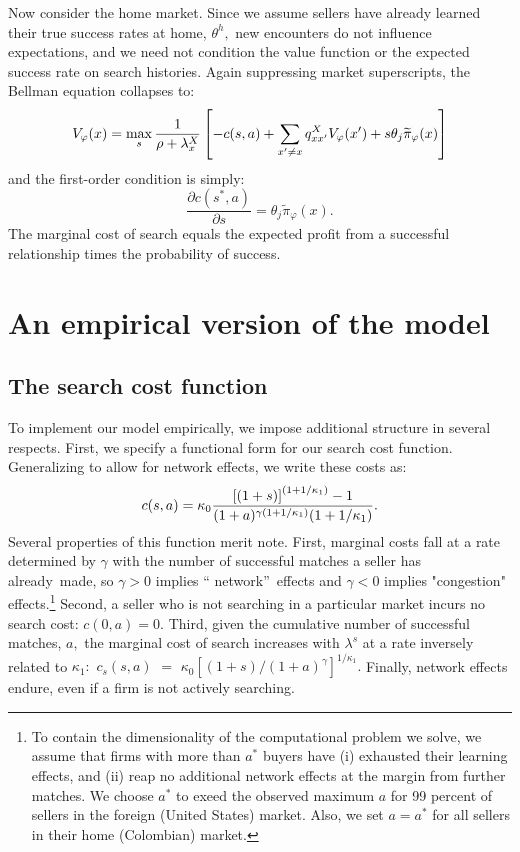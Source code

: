Now consider the home market. Since we assume sellers have already learned
their true success rates at home, $\theta ^{h},$ new encounters do not
influence expectations, and we need not condition the value function or the
expected success rate on search histories$.$ Again suppressing market
superscripts, the Bellman equation collapses to:%
\begin{equation}
V_{\varphi }(x)=\max_{s}\frac{1}{\rho +\lambda _{x}^{X}}\left[
-c(s,a)+\sum_{x^{\prime }\neq x}q_{xx^{\prime }}^{X}V_{\varphi }(x^{\prime
})+s\theta _{j}\widetilde{\pi }_{\varphi }(x)\right]  \notag
\end{equation}%
and the first-order condition is simply:%
\begin{equation*}
\frac{\partial c(s^{\ast },a)}{\partial s}=\theta _{j}\widetilde{\pi }%
_{\varphi }(x).
\end{equation*}%
The marginal cost of search equals the expected profit from a successful
relationship times the probability of success.

\section{An empirical version of the model}

\subsection{The search cost function}

To implement our model empirically, we impose additional structure in
several respects. First, we specify a functional form for our search cost
function. Generalizing \citet{arkolakis2010market} to allow for network effects, we write these costs as:%
\begin{equation}
c(s,a)=\kappa _{0}\frac{\left[ (1+s)\right] ^{(1+1/\kappa _{1})}-1}{%
(1+a)^{\gamma (1+1/\kappa _{1})}(1+1/\kappa _{1})}.  \label{cost of effort}
\end{equation}%
Several properties of this function merit note. First, marginal costs fall
at a rate determined by $\gamma $ with the number of successful matches a
seller has already\ made, so $\gamma >0$ implies \textquotedblleft
network\textquotedblright\ effects and $\gamma <0$ implies "congestion"
effects.\footnote{%
To contain the dimensionality of the computational problem we solve, we
assume that firms with more than $a^{\ast }$ buyers have (i) exhausted their
learning effects, and (ii) reap no additional network effects at the margin
from further matches. We choose $a^{\ast }$ to exeed the observed maximum $a$
for 99 percent of sellers in the foreign (United States) market. Also, we
set $a=a^{\ast }$ for all sellers in their home (Colombian) market.\medskip}
Second, a seller who is not searching in a particular market incurs no
search cost: $c(0,a)=0.$ Third, given the cumulative number of successful
matches, $a,$ the marginal cost of search increases with $\lambda ^{s}$ at a
rate inversely related to $\kappa _{1}:$ $c_{s}(s,a)$ $=$ $\kappa _{0}\left[
(1+s)/(1+a)^{\gamma }\right] ^{1/\kappa _{1}}.$ Finally, network effects
endure, even if a firm is not actively searching.

